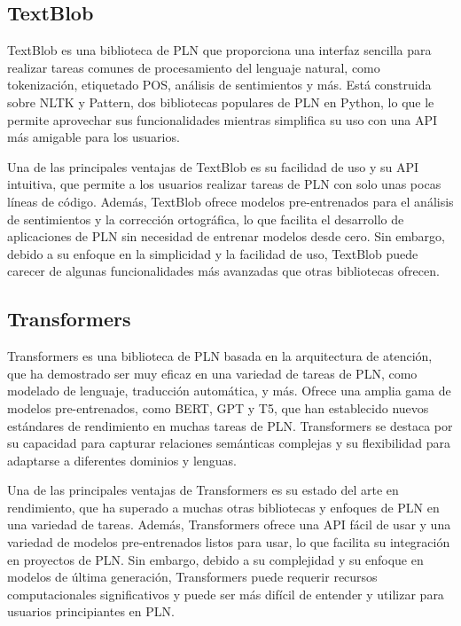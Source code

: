 \subsection{TextBlob}

TextBlob es una biblioteca de PLN que proporciona una interfaz sencilla para realizar tareas comunes de procesamiento del lenguaje natural, como tokenización, etiquetado POS, análisis de sentimientos y más. Está construida sobre NLTK y Pattern, dos bibliotecas populares de PLN en Python, lo que le permite aprovechar sus funcionalidades mientras simplifica su uso con una API más amigable para los usuarios.

Una de las principales ventajas de TextBlob es su facilidad de uso y su API intuitiva, que permite a los usuarios realizar tareas de PLN con solo unas pocas líneas de código. Además, TextBlob ofrece modelos pre-entrenados para el análisis de sentimientos y la corrección ortográfica, lo que facilita el desarrollo de aplicaciones de PLN sin necesidad de entrenar modelos desde cero. Sin embargo, debido a su enfoque en la simplicidad y la facilidad de uso, TextBlob puede carecer de algunas funcionalidades más avanzadas que otras bibliotecas ofrecen.

\subsection{Transformers}

Transformers es una biblioteca de PLN basada en la arquitectura de atención, que ha demostrado ser muy eficaz en una variedad de tareas de PLN, como modelado de lenguaje, traducción automática, y más. Ofrece una amplia gama de modelos pre-entrenados, como BERT, GPT y T5, que han establecido nuevos estándares de rendimiento en muchas tareas de PLN. Transformers se destaca por su capacidad para capturar relaciones semánticas complejas y su flexibilidad para adaptarse a diferentes dominios y lenguas.

Una de las principales ventajas de Transformers es su estado del arte en rendimiento, que ha superado a muchas otras bibliotecas y enfoques de PLN en una variedad de tareas. Además, Transformers ofrece una API fácil de usar y una variedad de modelos pre-entrenados listos para usar, lo que facilita su integración en proyectos de PLN. Sin embargo, debido a su complejidad y su enfoque en modelos de última generación, Transformers puede requerir recursos computacionales significativos y puede ser más difícil de entender y utilizar para usuarios principiantes en PLN.

